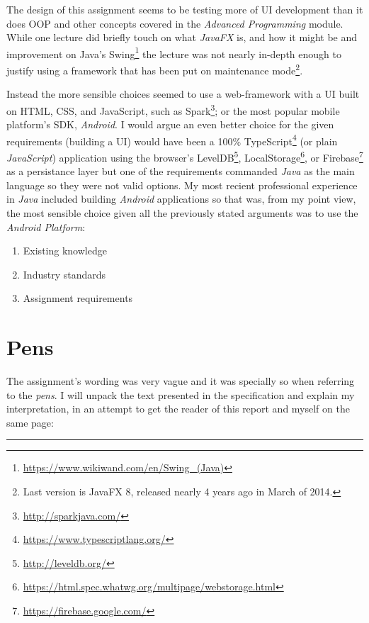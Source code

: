 \documentclass[english,a4paper,]{report}
\DeclareRobustCommand{\href}[2]{#2\footnote{\url{#1}}}
\providecommand{\tightlist}{%
  \setlength{\itemsep}{0pt}\setlength{\parskip}{0pt}}
\begin{document}
The design of this assignment seems to be testing more of UI development
than it does OOP and other concepts covered in the \emph{Advanced
Programming} module. While one lecture did briefly touch on what
\emph{JavaFX} is, and how it might be and improvement on Java's
\href{https://www.wikiwand.com/en/Swing_(Java)}{Swing} the lecture was
not nearly in-depth enough to justify using a framework that has been
put on maintenance mode\footnote{Last version is JavaFX 8, released
  nearly 4 years ago in March of 2014.}.

Instead the more sensible choices seemed to use a web-framework with a
UI built on HTML, CSS, and JavaScript, such as
\href{http://sparkjava.com/}{Spark}; or the most popular mobile
platform's SDK, \emph{Android}. I would argue an even better choice for
the given requirements (building a UI) would have been a 100\%
\href{https://www.typescriptlang.org/}{TypeScript} (or plain
\emph{JavaScript}) application using the browser's
\href{http://leveldb.org/}{LevelDB},
\href{https://html.spec.whatwg.org/multipage/webstorage.html}{LocalStorage},
or \href{https://firebase.google.com/}{Firebase} as a persistance layer
but one of the requirements commanded \emph{Java} as the main language
so they were not valid options. My most recient professional experience
in \emph{Java} included building \emph{Android} applications so that
was, from my point view, the most sensible choice given all the
previously stated arguments was to use the \emph{Android Platform}:

\begin{enumerate}
\def\labelenumi{\arabic{enumi}.}
\tightlist
\item
  Existing knowledge
\item
  Industry standards
\item
  Assignment requirements
\end{enumerate}

\hypertarget{pens}{%
\section{Pens}\label{pens}}

The assignment's wording was very vague and it was specially so when
referring to the \emph{pens}. I will unpack the text presented in the
specification and explain my interpretation, in an attempt to get the
reader of this report and myself on the same page:

\begin{center}\rule{0.5\linewidth}{\linethickness}\end{center}
\end{document}
